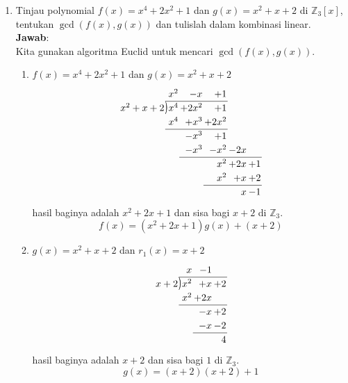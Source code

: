 \documentclass[10pt,openany,a4paper]{article}
\newcommand{\longdiv}{\smash{\mkern-0.43mu\vstretch{1.31}{\hstretch{.7}{)}}\mkern-5.2mu\vstretch{1.31}{\hstretch{.7}{)}}}}
\newcommand{\Z}{\mathbb{Z}}
\newcommand{\jawab}{\textbf{Jawab}:}
\begin{document}
\begin{enumerate}
    \item Tinjau polynomial $f(x)=x^4+2x^2+1$ dan $g(x)=x^2+x+2$ di $\Z_3[x]$, tentukan $\gcd(f(x),g(x))$ dan tulislah dalam kombinasi linear.\\
    \jawab\\
    Kita gunakan algoritma Euclid untuk mencari $\gcd(f(x),g(x))$.
    \begin{enumerate}[label=(\roman*)]
        \item $f(x)=x^4+2x^2+1$ dan $g(x)=x^2+x+2$
        \[
        \arraycolsep=1pt
        \renewcommand\arraystretch{1.2}
        \begin{array}{*1r @{\hskip\arraycolsep}c@{\hskip\arraycolsep} *{11}r}
            & &x^2&-x&+1&\\
    \cline{2-5}
    x^2+x+2 & \longdiv & x^4 & + 2x^2 &+ 1  \\
            &  & x^4 &+ x^3 & + 2x^2  \\
    \cline{2-5}
            &  & &-x^3 &+ 1  \\
            &  & &-x^3 &-x^2 &-2x  \\
    \cline{4-7}
            &  & & &x^2 &+2x &+ 1  \\
            &  & & &x^2 &+ x &+2  \\
    \cline{5-7}
            &  & & & &x &-1  \\
    \end{array}\]
    hasil baginya adalah $x^2+2x+1$ dan sisa bagi $x+2$ di $\Z_3$. 
    \begin{equation}\label{1}
        f(x)=(x^2+2x+1)g(x)+(x+2)
    \end{equation}
        \item $g(x)=x^2+x+2$ dan $r_1(x)=x+2$
        \[\arraycolsep=1pt
        \renewcommand\arraystretch{1.2}
        \begin{array}{*1r @{\hskip\arraycolsep}c@{\hskip\arraycolsep} *{11}r}
        & & x &-1 &\\
        \cline{2-5}
        x+2 & \longdiv & x^2 & +x & +2 \\
        & & x^2 & +2x\\
        \cline{2-5}
        & & & -x & +2 \\
        & & & -x & -2 \\
        \cline{4-5}
        & & & & 4
        \end{array}\]
        hasil baginya adalah $x+2$ dan sisa bagi $1$ di $\Z_3$.
        \begin{equation}\label{2}
            g(x)=(x+2)(x+2)+1
        \end{equation}

\end{enumerate}
\end{enumerate}
\end{document}
